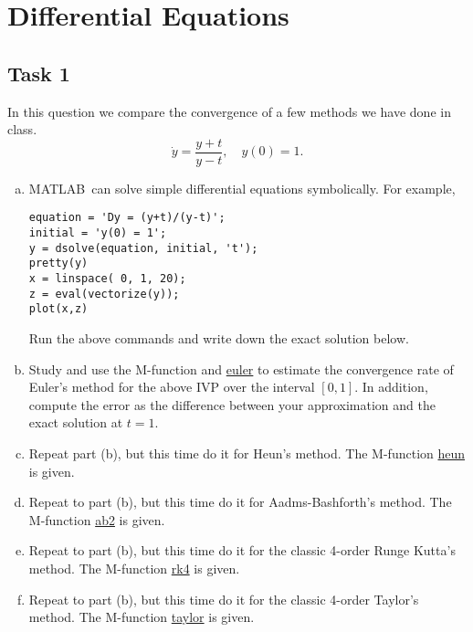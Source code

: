 \chapter{Differential Equations}

\section*{Task 1}
In this question we compare the convergence of a few methods we have done in class.
\[ \dot{y}=\frac{y+t}{y-t}, \quad y(0)=1. \]
\begin{enumerate}[(a)]
	\item MATLAB\texttrademark\ can solve simple differential equations symbolically.
	For example,
	\begin{lstlisting}[style=Matlab-editor]
equation = 'Dy = (y+t)/(y-t)';
initial = 'y(0) = 1';
y = dsolve(equation, initial, 't');
pretty(y)
x = linspace( 0, 1, 20);
z = eval(vectorize(y));
plot(x,z)
	\end{lstlisting}
	Run the above commands and write down the exact solution below.
	\item Study and use the M-function {\color{blue}{butcher}} and \hyperref[euler]{euler} to estimate the convergence rate of Euler's method for the above IVP over the interval \([0, 1]\).
	In addition, compute the error as the difference between your approximation and the exact solution at \(t = 1\).
	\item Repeat part (b), but this time do it for Heun's method.
	The M-function \hyperref[heun]{heun} is given.
	\item Repeat to part (b), but this time do it for Aadms-Bashforth's method.
	The M-function \hyperref[ab2]{ab2} is given.
	\item Repeat to part (b), but this time do it for the classic 4-order Runge Kutta's method.
	The M-function \hyperref[rk4]{rk4} is given.
	\item Repeat to part (b), but this time do it for the classic 4-order Taylor's method.
	The M-function \hyperref[taylor]{taylor} is given.
\end{enumerate}


